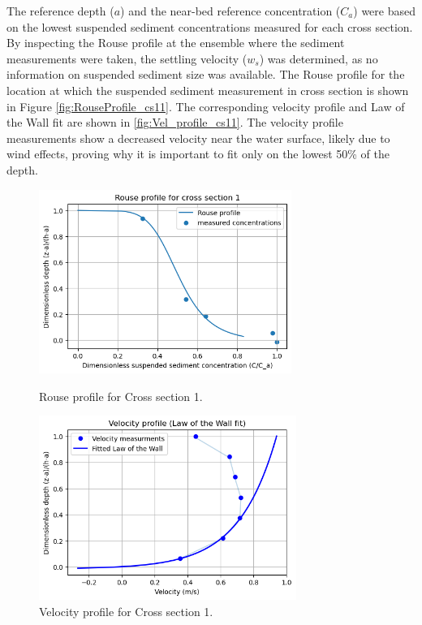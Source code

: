The reference depth ($a$) and the near-bed reference concentration ($C_a$) were based on the lowest suspended sediment concentrations measured for each cross section. By inspecting the Rouse profile at the ensemble where the sediment measurements were taken, the settling velocity ($w_s$) was determined, as no information on suspended sediment size was available. The Rouse profile for the location at which the suspended sediment measurement in cross section is shown in Figure \ref{fig:RouseProfile_cs11}. The corresponding velocity profile and Law of the Wall fit are shown in \ref{fig:Vel_profile_cs11}. The velocity profile measurements show a decreased velocity near the water surface, likely due to wind effects, proving why it is important to fit only on the lowest 50\% of the depth.

\begin{figure}[H]
    \centering
    \begin{minipage}[b]{0.48\linewidth}
        \centering
        \includegraphics[height=6cm]{figures/ch6/RouseProfile_cs11.png}
        \caption{Rouse profile for Cross section 1.}
        \label{fig:RouseProfile_cs11}
    \end{minipage}
    \hfill
    \begin{minipage}[b]{0.48\linewidth}
        \centering
        \includegraphics[height=6cm]{figures/ch6/cs1_vel_big.png}
        \caption{Velocity profile for Cross section 1.}
        \label{fig:VelProfile_cs11}
    \end{minipage}
\end{figure}

